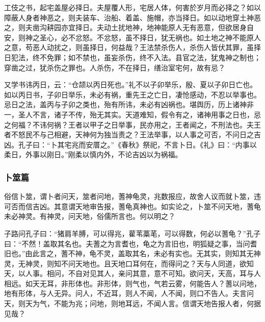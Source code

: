 \documentclass[]{article}
\begin{document}
工伎之书，起宅盖屋必择日。夫屋覆人形，宅居人体，何害於岁月而必择之？如以障蔽人身者神恶之，则夫装车、治船、着盖、施帽，亦当择日。如以动地穿土神恶之，则夫凿沟耕园亦宜择日。夫动土扰地神，地神能原人无有恶意，但欲居身自安，则神之圣心，必不忿怒。不忿怒，虽不择日，犹无祸也。如土地之神不能原人之意，苟恶人动扰之，则虽择日，何益哉？王法禁杀伤人，杀伤人皆伏其罪，虽择日犯法，终不免罪；如不禁也，虽妄杀伤，终不入法。县官之法，犹鬼神之制也；穿凿之过，犹杀伤之罪也。人杀伤，不在择日，缮治室宅何，故有忌？

又学书讳丙日，云：``仓颉以丙日死也。''礼不以子卯举乐，殷、夏以子卯日亡也。如以丙日书，子卯日举乐，未必有祸，重先王之亡日，凄怆感动，不忍以举事也。忌日之法，盖丙与子卯之类也，殆有所讳，未必有凶祸也。堪舆历，历上诸神非一，圣人不言，诸子不传，殆无其实。天道难知，假令有之，诸神用事之日也，忌之何福？不讳何祸？王者以甲子之日举事，民亦用之，王者闻之，不刑法也。夫王者不怒民不与己相避，天神何为独当责之？王法举事，以人事之可否，不问日之吉凶。孔子曰：``卜其宅兆而安厝之。''《春秋》祭祀，不言卜日。《礼》曰：``内事以柔日，外事以刚日。''刚柔以慎内外，不论吉凶以为祸福。

\hypertarget{header-n842}{%
\subsubsection{卜筮篇}\label{header-n842}}

俗信卜筮，谓卜者问天，筮者问地，蓍神龟灵，兆数报应，故舍人议而就卜筮，违可否而信吉凶。其意谓天地审告报，蓍龟真神也。如实论之，卜筮不问天地，蓍龟未必神灵。有神灵，问天地，俗儒所言也。何以明之？

子路问孔子曰：``猪肩羊膊，可以得兆，雚苇藁芼，可以得数，何必以蓍龟？''孔子曰：``不然！盖取其名也。夫蓍之为言耆也，龟之为言旧也，明狐疑之事，当问耆旧也。''由此言之，蓍不神，龟不灵，盖取其名，未必有实也。无其实，则知其无神灵，无神灵，则知不问天地也。且天地口耳何在，而得问之？天与人同道，欲知天，以人事。相问，不自对见其人，亲问其意，意不可知。欲问天，天高，耳与人相远。如天无耳，非形体也。非形体，则气也，气若云雾，何能告人？蓍以问地，地有形体，与人无异。问人，不近耳，则人不闻，人不闻，则口不告人。夫言问天，则天为气，不能为兆；问地，则地耳远，不闻人言。信谓天地告报人者，何据见哉？
\end{document}

